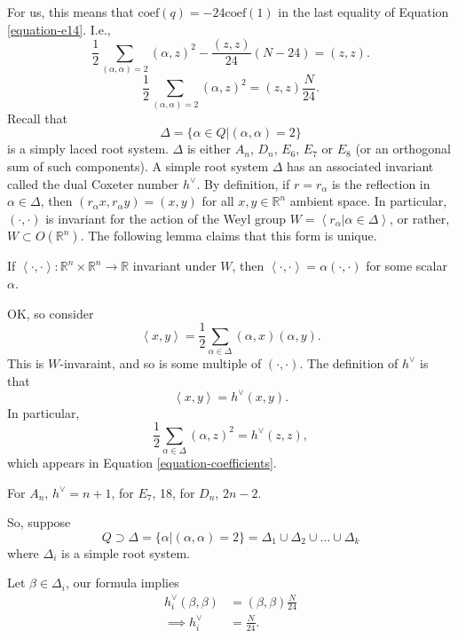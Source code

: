 For us, this means 
that $\text{coef}(q)=-24\text{coef}(1)$ in the last equality of
Equation \ref{equation-e14}.
I.e.,
\begin{equation}
\label{equation-coefficients}
\frac{1}{2}\sum_{(\alpha,\alpha)=2}(\alpha,z)^2
-\frac{(z,z)}{24}(N-24)=(z,z).
\end{equation}
$$
\frac{1}{2}\sum_{(\alpha,\alpha)=2}(\alpha,z)^2=(z,z)\frac{N}{24}.
$$
Recall that
$$
\Delta=\{\alpha\in Q|(\alpha,\alpha)=2\}
$$
is a simply laced root system.
$\Delta$ is either $A_n$, $D_n$, $E_6$, $E_7$ or $E_8$
(or an orthogonal sum of such components).
A simple root system $\Delta$ has 
an associated invariant called the dual Coxeter number
$h^\vee$. By definition, if $r=r_\alpha$ is
the reflection in $\alpha \in \Delta$,
then $(r_\alpha x,r_\alpha y)=(x,y)$ for all
$x,y \in \mathbb{R}^n$ ambient space.
In particular, $(\cdot,\cdot)$ is invariant
for the action of the Weyl group
$W=\left<r_\alpha|\alpha \in \Delta\right>$,
or rather, $W \subset O(\mathbb{R}^n)$.
The following lemma claims that this form is unique.

\begin{lemma}
\label{lemma-uniqueness-of-bilinear-form}
If $\left<\cdot,\cdot\right>:\mathbb{R}^n\times\mathbb{R}^n\to\mathbb{R}$
invariant under $W$, then
$\left<\cdot,\cdot\right>=\alpha(\cdot,\cdot)$
for some scalar $\alpha$.
\end{lemma}

\noindent
OK, so consider
$$
\left<x,y\right>=\frac{1}{2}
\sum_{\alpha \in \Delta}(\alpha,x)(\alpha,y).
$$
This is $W$-invaraint, and so is some multiple of $(\cdot,\cdot)$.
The definition of $h^\vee$ is that
$$
\left<x,y\right>=h^\vee(x,y).
$$
In particular,
$$
\frac{1}{2}\sum_{\alpha \in \Delta}(\alpha,z)^2=h^\vee(z,z),
$$
which appears in Equation \ref{equation-coefficients}.

\begin{example}
\label{example-coxeter-numbers}
For $A_n$, $h^\vee=n+1$, for $E_7$, 18,
for $D_n$, $2n-2$.
\end{example}

\noindent
So, suppose
$$
Q \supset \Delta=\{\alpha|(\alpha,\alpha)=2\}
=\Delta_1\cup \Delta_2\cup \ldots\cup \Delta_k
$$
where $\Delta_i$ is a simple root system.

Let $\beta\in\Delta_i$, our formula implies
\begin{align*}
h_i^\vee(\beta,\beta)&=(\beta,\beta)\frac{N}{24}\\
\implies h_i^\vee&=\frac{N}{24}.
\end{align*}

